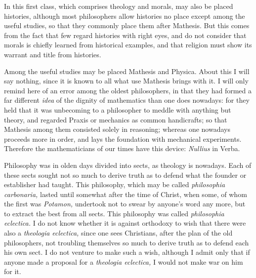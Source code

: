 \documentclass[12pt,a4paper,openany]{book}
\newcommand{\opage}[1]{\marginnote{\footnotesize\textit{[#1]}}}
\begin{document}
In this first class, which comprises theology and morals, may also be placed
histories, although most philosophers allow histories no place except among the
useful studies, so that they commonly place them after Mathesis. But this comes
from the fact that few regard histories with right eyes, and do not consider that
morals is chiefly learned from historical examples, and that religion must show
its warrant and title from histories.

\setcounter{footnote}{0}%
\opage{21}Among the useful studies may be placed Mathesis and Physica. About this I
will say nothing, since it is known to all what use Mathesis brings with it. I
will only remind here of an error among the oldest philosophers, in that they had
formed a far different \textit{idea} of the dignity of mathematics than one does
nowadays: for they held that it was unbecoming to a philosopher to meddle with
anything but theory, and regarded Praxis or mechanics as common handicrafts; so
that Mathesis among them consisted solely in reasoning; whereas one nowadays
proceeds more in order, and lays the foundation with mechanical experiments.
Therefore the mathematicians of our times have this device: \textit{Nullius} in
Verba.

Philosophy was in olden days divided into sects, as theology is nowadays. Each
of these sects sought not so much to derive truth as to defend what the founder
or establisher had taught. This philosophy, which may be called \textit{philosophia
carbonaria,} lasted until somewhat after the time of Christ, when some, of whom
the first was \textit{Potamon,} undertook not to swear by anyone's word any more,
but to extract the best from all sects. This philosophy was called
\textit{philosophia eclectica.} I do not know whether it is against orthodoxy to
wish that there were also a \textit{theologia eclectica,} since one sees
Christians, after the plan of the old philosophers, not troubling themselves so
much to derive truth as to defend each his own sect. I do not venture to make such
a wish, although I admit only that if anyone made a proposal for a
\textit{theologia eclectica,} I would not make war on him for it.
\end{document}
